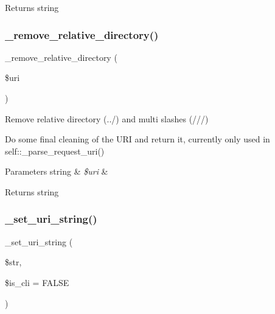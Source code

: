\begin{DoxyReturn}{Returns}
string 
\end{DoxyReturn}
\mbox{\label{class_c_i___u_r_i_a01fdc82a66a1611d3e5d42461c1ad59c}} 
\subsubsection{\texorpdfstring{\+\_\+remove\+\_\+relative\+\_\+directory()}{\_remove\_relative\_directory()}}
{\footnotesize\ttfamily \+\_\+remove\+\_\+relative\+\_\+directory (\begin{DoxyParamCaption}\item[{}]{\$uri }\end{DoxyParamCaption})\hspace{0.3cm}{\ttfamily [protected]}}

Remove relative directory (../) and multi slashes (///)

Do some final cleaning of the U\+RI and return it, currently only used in self\+::\+\_\+parse\+\_\+request\+\_\+uri()


\begin{DoxyParams}[1]{Parameters}
string & {\em \$uri} & \\
\hline
\end{DoxyParams}
\begin{DoxyReturn}{Returns}
string 
\end{DoxyReturn}
\mbox{\label{class_c_i___u_r_i_a7c53faa0ca2ee92752a28fc1171961e5}} 
\subsubsection{\texorpdfstring{\+\_\+set\+\_\+uri\+\_\+string()}{\_set\_uri\_string()}}
{\footnotesize\ttfamily \+\_\+set\+\_\+uri\+\_\+string (\begin{DoxyParamCaption}\item[{}]{\$str,  }\item[{}]{\$is\+\_\+cli = {\ttfamily FALSE} }\end{DoxyParamCaption})\hspace{0.3cm}{\ttfamily [protected]}}

